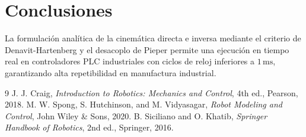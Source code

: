 \documentclass[11pt,a4paper]{article}
\begin{document}
\section{Conclusiones}
La formulación analítica de la cinemática directa e inversa mediante el criterio de Denavit-Hartenberg y el desacoplo de Pieper permite una ejecución en tiempo real en controladores PLC industriales con ciclos de reloj inferiores a $1\,\text{ms}$, garantizando alta repetibilidad en manufactura industrial.

\begin{thebibliography}{9}
 J. J. Craig, \textit{Introduction to Robotics: Mechanics and Control}, 4th ed., Pearson, 2018.
 M. W. Spong, S. Hutchinson, and M. Vidyasagar, \textit{Robot Modeling and Control}, John Wiley \& Sons, 2020.
 B. Siciliano and O. Khatib, \textit{Springer Handbook of Robotics}, 2nd ed., Springer, 2016.
\end{thebibliography}
\end{document}
